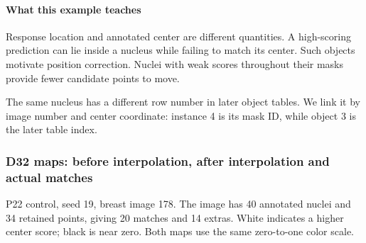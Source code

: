 \documentclass[
  12pt,
]{article}
\begin{document}
\begin{center}\end{center}
\paragraph{What this example teaches}
Response location and annotated center are different quantities. A high-scoring prediction can lie inside a nucleus while failing to match its center. Such objects motivate position correction. Nuclei with weak scores throughout their masks provide fewer candidate points to move.

The same nucleus has a different row number in later object tables. We link it by image number and center coordinate: instance 4 is its mask ID, while object 3 is the later table index.

\subsubsection{D32 maps: before interpolation, after interpolation and actual matches}\label{chapter9}
P22 control, seed 19, breast image 178. The image has 40 annotated nuclei and 34 retained points, giving 20 matches and 14 extras. White indicates a higher center score; black is near zero. Both maps use the same zero-to-one color scale.
\end{document}
